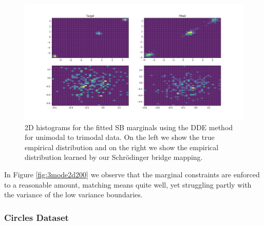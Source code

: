 \documentclass[a4paper,12pt,twoside,openright]{report}
\theoremstyle{definition}
\begin{document}
\begin{figure}
    \centering
    \includegraphics[scale=0.4,trim={2.3cm 1cm 2.5cm 0}, clip]{images/GP/2d_3mode_GP_means_3.3_3.6_0.7_std_0.1_hist_200.png}
    \caption{ 2D histograms for the fitted SB marginals using the DDE method for unimodal to trimodal data.  On the left we show the true empirical distribution and on the right we show the empirical distribution learned by our Schrödinger bridge mapping.}
    \label{fig:3mode2d200hist}
\end{figure}
In Figure \ref{fig:3mode2d200} we observe that the marginal constraints are enforced to a reasonable amount, matching means quite well, yet struggling partly with the variance of the low variance boundaries.
\subsubsection{Circles Dataset}
\end{document}
